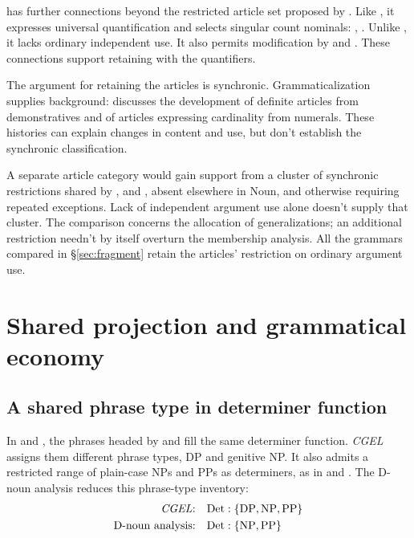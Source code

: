 \documentclass[12pt]{article}
\begin{document}
 has further connections beyond the restricted article set proposed by \textcite{spinillo2004reconceptualising}. Like , it expresses universal quantification and selects singular count nominals: , . Unlike , it lacks ordinary independent use. It also permits modification by  and . These connections support retaining  with the quantifiers.

The argument for retaining the articles is synchronic. Grammaticalization supplies background: \textcite[331--336]{lyons1999} discusses the development of definite articles from demonstratives and of articles expressing cardinality from numerals. These histories can explain changes in content and use, but don't establish the synchronic classification.

A separate article category would gain support from a cluster of synchronic restrictions shared by ,  and , absent elsewhere in Noun, and otherwise requiring repeated exceptions. Lack of independent argument use alone doesn't supply that cluster. The comparison concerns the allocation of generalizations; an additional restriction needn't by itself overturn the membership analysis. All the grammars compared in §\ref{sec:fragment} retain the articles' restriction on ordinary argument use.

\section{Shared projection and grammatical economy}\label{sec:economy}

\subsection{A shared phrase type in determiner function}\label{sec:det-uniform}

In  and , the phrases headed by  and  fill the same determiner function. \textit{CGEL} assigns them different phrase types, DP and genitive NP. It also admits a restricted range of plain-case NPs and PPs as determiners, as in  and  \citep[Ch.~5, §4]{huddleston2002}. The D-noun analysis reduces this phrase-type inventory:
\[
\begin{aligned}
\text{\textit{CGEL}:} &\quad \mathrm{Det}:\{\mathrm{DP},\mathrm{NP},\mathrm{PP}\} \\
\text{D-noun analysis:} &\quad \mathrm{Det}:\{\mathrm{NP},\mathrm{PP}\}
\end{aligned}
\]
\end{document}
